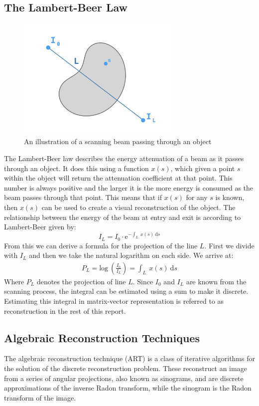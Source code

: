 \subsection{The Lambert-Beer Law}
\begin{figure}[H]
    \centering
    \includegraphics[width=0.7\textwidth]{figures/lambertbeer.png}
    \caption{An illustration of a scanning beam passing through an object}
    \label{fig:lambertbeer}
\end{figure}
The Lambert-Beer law describes the energy attenuation of a beam as it passes through an object. It does this using a function $x(s)$, which given a point $s$ within the object will return the attenuation coefficient at that point. This number is always positive and the larger it is the more energy is consumed as the beam passes through that point. This means that if $x(s)$ for any $s$ is known, then $x(s)$ can be used to create a visual reconstruction of the object. The relationship between the energy of the beam at entry and exit is according to Lambert-Beer given by:
$$
    I_{L} = I_{0} \cdot \text{e}^{-\int_{L}~x(s)~\text{d}s} 
$$
From this we can derive a formula for the projection of the line $L$. First we divide with $I_L$ and then we take the natural logarithm on each side. We arrive at:
\begin{align*}
    P_L = \text{log}~\left(\frac{I_{0}}{I_{L}}\right) = \int_{L}~x(s)~\text{d}s
\end{align*}
Where $P_L$ denotes the projection of line $L$. Since $I_0$ and $I_L$ are known from the scanning process, the integral can be estimated using a sum to make it discrete. Estimating this integral in matrix-vector representation is referred to as reconstruction in the rest of this report.

\subsection{Algebraic Reconstruction Techniques}
The algebraic reconstruction technique (ART) is a class of iterative algorithms for the solution of the discrete reconstruction problem. These reconstruct an image from a series of angular projections, also known as sinograms, and are discrete approximations of the inverse Radon transform, while the sinogram is the Radon transform of the image\cite{PRESS}.

